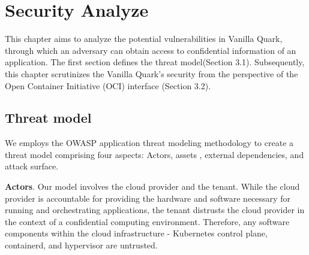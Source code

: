 \chapter{Security Analyze}
\label{sec:security_analyse}





This chapter aims to analyze the potential vulnerabilities in Vanilla Quark, through which an adversary can obtain access to confidential information of an application. The first section defines the threat model(Section 3.1). Subsequently, this chapter scrutinizes the Vanilla Quark's security from the perspective of the Open Container Initiative (OCI) interface (Section 3.2).



\section{Threat model}

We employs the OWASP application threat modeling methodology\cite*{OWASP_Threat_Modeling} to create a threat model comprising four aspects: Actors, assets , external dependencies, and attack surface.

\textbf{Actors}. Our model involves the cloud provider and the tenant. While the cloud provider is accountable for providing the hardware and software necessary for running and orchestrating applications, the tenant distrusts the cloud provider 
in the context of a confidential computing environment. Therefore, any software components within the cloud infrastructure - Kubernetes control plane\cite*{k8s}, containerd\cite*{containerd}, and hypervisor are untrusted.


